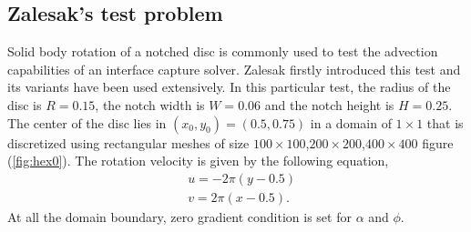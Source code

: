 \subsection{Zalesak's test problem}
Solid body rotation of a notched disc is commonly used to test the advection capabilities of an interface capture solver. Zalesak firstly introduced this test \citep{zalesak1979fully} and its variants have been used extensively. In this particular test, the radius of the disc is $R=0.15$, the notch width is $W=0.06$ and the notch height is $H=0.25$. The center of the disc lies in $(x_0,y_0)=(0.5,0.75)$ in a domain of $1\times{1}$ that is discretized using rectangular meshes of size $100\times{100}$,$200\times{200}$,$400\times{400}$ figure (\ref{fig:hex0}). The rotation velocity is given by the following equation,
\begin{equation}\label{27}
\begin{split}
&u=-2\pi(y-0.5)
\\
&v=2\pi(x-0.5).
\end{split}
\end{equation}
At all the domain boundary, zero gradient condition is set for $\alpha$ and $\phi$. 

